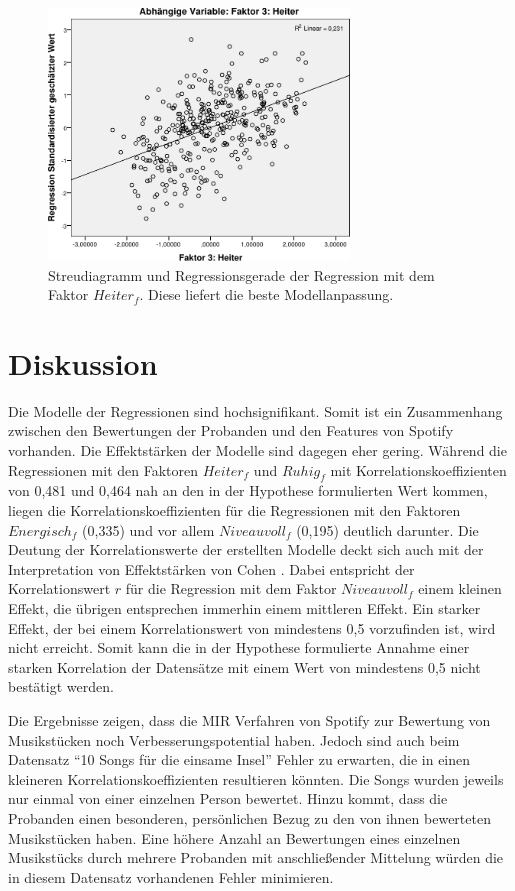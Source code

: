 \begin{figure}[hbt]
    \begin{center}
        \includegraphics[width=8cm]{images/StreudiagrammFak3.pdf}
    \end{center}
    \caption{Streudiagramm und Regressionsgerade der Regression mit dem Faktor $Heiter_f$. Diese liefert die beste Modellanpassung.}
    \label{fig:Faktor3}
\end{figure}

\section*{Diskussion}
\label{sec:Diskussion}


Die Modelle der Regressionen sind hochsignifikant.
Somit ist ein Zusammenhang zwischen den Bewertungen der Probanden und den Features von Spotify vorhanden.
Die Effektstärken der Modelle sind dagegen eher gering. 
Während die Regressionen mit den Faktoren $Heiter_f$ und $Ruhig_f$ mit Korrelationskoeffizienten von 0,481 und 0,464 nah an den in der Hypothese formulierten Wert kommen, liegen die Korrelationskoeffizienten für die Regressionen mit den Faktoren  $Energisch_f$ (0,335) und vor allem $Niveauvoll_f$ (0,195) deutlich darunter.
Die Deutung der Korrelationswerte der erstellten Modelle deckt sich auch mit der Interpretation von Effektstärken von Cohen \cite{cohen1988}.
Dabei entspricht der Korrelationswert $r$ für die Regression mit dem Faktor $Niveauvoll_f$ einem kleinen Effekt, die übrigen entsprechen immerhin einem mittleren Effekt.
Ein starker Effekt, der bei einem Korrelationswert von mindestens 0,5 vorzufinden ist, wird nicht erreicht.
Somit kann die in der Hypothese formulierte Annahme einer starken Korrelation der Datensätze mit einem Wert von mindestens 0,5 nicht bestätigt werden. 

Die Ergebnisse zeigen, dass die MIR Verfahren von Spotify zur Bewertung von Musikstücken noch Verbesserungspotential haben.
Jedoch sind auch beim Datensatz "`10 Songs für die einsame Insel"' Fehler zu erwarten, die in einen kleineren Korrelationskoeffizienten resultieren könnten.
Die Songs wurden jeweils nur einmal von einer einzelnen Person bewertet.
Hinzu kommt, dass die Probanden einen besonderen, persönlichen Bezug zu den von ihnen bewerteten Musikstücken haben.
Eine höhere Anzahl an Bewertungen eines einzelnen Musikstücks durch mehrere Probanden mit anschließender Mittelung würden die in diesem Datensatz vorhandenen Fehler minimieren.

